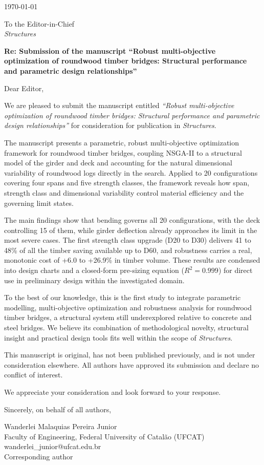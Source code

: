 \clearpage
\thispagestyle{empty}
\begingroup
\setlength{\parindent}{0pt}

\today

\bigskip
To the Editor-in-Chief \\
\textit{Structures}

\bigskip
\textbf{Re: Submission of the manuscript ``Robust multi-objective optimization of roundwood timber bridges: Structural performance and parametric design relationships''}

\bigskip
Dear Editor,

\bigskip
We are pleased to submit the manuscript entitled \textit{``Robust multi-objective optimization of roundwood timber bridges: Structural performance and parametric design relationships''} for consideration for publication in \textit{Structures}.

The manuscript presents a parametric, robust multi-objective optimization framework for roundwood timber bridges, coupling NSGA-II to a structural model of the girder and deck and accounting for the natural dimensional variability of roundwood logs directly in the search. Applied to 20 configurations covering four spans and five strength classes, the framework reveals how span, strength class and dimensional variability control material efficiency and the governing limit states.

The main findings show that bending governs all 20 configurations, with the deck controlling 15 of them, while girder deflection already approaches its limit in the most severe cases. The first strength class upgrade (D20 to D30) delivers 41 to 48\% of all the timber saving available up to D60, and robustness carries a real, monotonic cost of +6.0 to +26.9\% in timber volume. These results are condensed into design charts and a closed-form pre-sizing equation ($R^2 = 0.999$) for direct use in preliminary design within the investigated domain.

To the best of our knowledge, this is the first study to integrate parametric modelling, multi-objective optimization and robustness analysis for roundwood timber bridges, a structural system still underexplored relative to concrete and steel bridges. We believe its combination of methodological novelty, structural insight and practical design tools fits well within the scope of \textit{Structures}.

This manuscript is original, has not been published previously, and is not under consideration elsewhere. All authors have approved its submission and declare no conflict of interest.

We appreciate your consideration and look forward to your response.

\bigskip
Sincerely, on behalf of all authors,

\bigskip
Wanderlei Malaquias Pereira Junior \\
Faculty of Engineering, Federal University of Catalão (UFCAT) \\
wanderlei\_junior@ufcat.edu.br \\
Corresponding author

\endgroup
